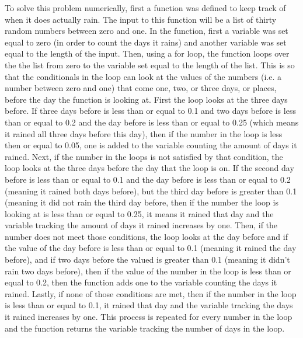 \documentclass[12pt]{article}
\begin{document}
	
	To solve this problem numerically, first a function was defined to keep track of when it
	does actually rain. The input to this function will be a list of thirty random numbers 
	between zero and one. In the function, first a variable was set equal to zero (in order to
	count the days it rains) and another variable was set equal to the length of the input.
	Then, using a for loop, the function loops over the the list from zero to the variable set 
	equal to the length of the list. This is so that the conditionals in the loop can look at the 
	values of the numbers (i.e. a number between zero and one) that come one, two, or 
	three days, or places, before the day the function is looking at. First the loop looks at
	the three days before. If 
	three days before is less than or equal to 0.1 and two days before is less than or equal 
	to 0.2 and the day before is less than or equal to 0.25 (which means it rained all three 
	days before this day), then if the number in the loop is less then or equal to 0.05, one is 
	added to the variable counting the amount of days it rained. Next, if the number in the 
	loops is not satisfied by that condition, the loop looks at 
	the three days before the day that the loop is on. If the second day before is 
	less than or equal to 0.1 and the day before is less than or equal to 0.2 (meaning it 
	rained both days before), but the third day before is greater than 0.1 (meaning it did not 
	rain the third day before, then if the number the loop is looking at is less than or equal 
	to 0.25, it means it rained that day and the variable tracking the amount of days it
	rained increases by one. Then, if the number does not meet those conditions, the loop
	looks at the day before and if the value of the day before is less than or equal to 0.1 
	(meaning it rained the day before), and if two days before the valued is greater than 0.1 
	(meaning it didn't rain two days before), then if the value of the number in the loop is 
	less than or equal to 0.2, then the function adds one to the variable counting the days it 
	rained. Lastly, if none of those conditions are met, then if the number in the loop is less
	than or equal to 0.1, it rained that day and the variable tracking the days it rained 
	increases by one. This process is repeated for every number in the loop and the 
	function returns the variable tracking the number of days in the loop.
	
\end{document}

